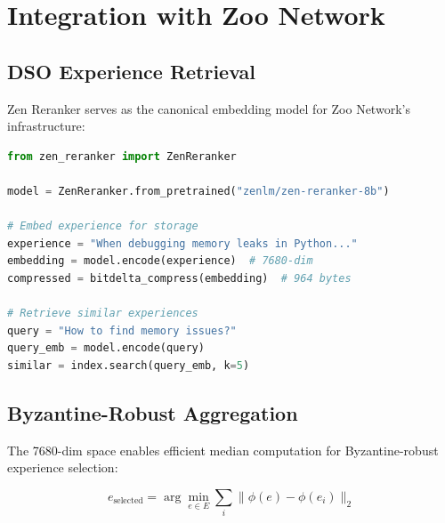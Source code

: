 \section{Integration with Zoo Network}


\subsection{DSO Experience Retrieval}

Zen Reranker serves as the canonical embedding model for Zoo Network's \DSO{} infrastructure:

\begin{lstlisting}[language=Python,basicstyle=\ttfamily\small]
from zen_reranker import ZenReranker

model = ZenReranker.from_pretrained("zenlm/zen-reranker-8b")

# Embed experience for storage
experience = "When debugging memory leaks in Python..."
embedding = model.encode(experience)  # 7680-dim
compressed = bitdelta_compress(embedding)  # 964 bytes

# Retrieve similar experiences
query = "How to find memory issues?"
query_emb = model.encode(query)
similar = index.search(query_emb, k=5)
\end{lstlisting}

\subsection{Byzantine-Robust Aggregation}

The 7680-dim space enables efficient median computation for Byzantine-robust experience selection:

\begin{equation}
e_{\text{selected}} = \arg\min_{e \in E} \sum_{i} \|\phi(e) - \phi(e_i)\|_2
\end{equation}

